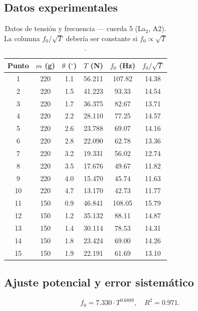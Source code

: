\documentclass[12pt,a4paper]{article}
\begin{document}
\subsection{Datos experimentales}

\begin{table}[H]
\centering
\caption{Datos de tensión y frecuencia — cuerda 5 (La$_2$, A2).
  La columna $f_0/\sqrt{T}$ debería ser constante si $f_0 \propto \sqrt{T}$.}
\label{tab:fT}
\smallskip
\begin{tabular}{cccccc}
\toprule
\textbf{Punto} & $m$ (g) & $\theta$ ($^\circ$) & $T$ (N) & $f_0$ (Hz)
  & $f_0/\sqrt{T}$ \\
\midrule
 1 & 220 & 1.1 & 56.211 & 107.82 & 14.38 \\
 2 & 220 & 1.5 & 41.223 &  93.33 & 14.54 \\
 3 & 220 & 1.7 & 36.375 &  82.67 & 13.71 \\
 4 & 220 & 2.2 & 28.110 &  77.25 & 14.57 \\
 5 & 220 & 2.6 & 23.788 &  69.07 & 14.16 \\
 6 & 220 & 2.8 & 22.090 &  62.78 & 13.36 \\
 7 & 220 & 3.2 & 19.331 &  56.02 & 12.74 \\
 8 & 220 & 3.5 & 17.676 &  49.67 & 11.82 \\
 9 & 220 & 4.0 & 15.470 &  45.74 & 11.63 \\
10 & 220 & 4.7 & 13.170 &  42.73 & 11.77 \\
11 & 150 & 0.9 & 46.841 & 108.05 & 15.79 \\
12 & 150 & 1.2 & 35.132 &  88.11 & 14.87 \\
13 & 150 & 1.4 & 30.114 &  78.53 & 14.31 \\
14 & 150 & 1.8 & 23.424 &  69.00 & 14.26 \\
15 & 150 & 1.9 & 22.191 &  61.69 & 13.10 \\
\bottomrule
\end{tabular}
\end{table}

\subsection{Ajuste potencial y error sistemático}

\begin{equation}
  f_0 = 7.330 \cdot T^{0.6889}, \quad R^2 = 0.971.
\end{equation}
\end{document}

